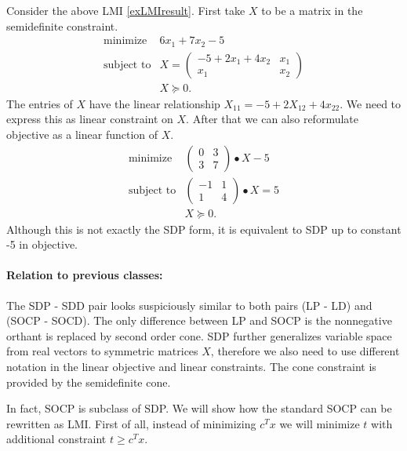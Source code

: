 \documentclass[10pt,oneside]{book}
\theoremstyle{definition}
\begin{document}
 Consider the above LMI \ref{exLMIresult}. First take $X$ to be a matrix in the semidefinite constraint.
\begin{equation}
\begin{array}{ll}
\mbox{minimize} &   6x_1 + 7x_2 -5 \\
\mbox{subject to}& X = \left(\begin{array}{cc}-5 + 2x_1 + 4x_2 & x_1\\ x_1&x_2\end{array}\right)  \\
& X\succeq 0.
\end{array} 
\end{equation}
The entries of $X$ have the linear relationship  $X_{11} = -5 + 2X_{12} + 4x_{22}.$ We need to express this as linear constraint on $X$. After that we can also reformulate objective as a linear function of $X$.
\begin{equation}
\begin{array}{ll}
\mbox{minimize} &  \left(\begin{array}{cc} 0&3\\ 3&7\end{array}\right)\bullet X  -5 \\
\mbox{subject to}& \left(\begin{array}{rr}-1&1\\ 1&4\end{array}\right)\bullet X = 5  \\
& X\succeq 0.
\end{array} 
\end{equation}
Although this is not exactly the SDP form, it is equivalent to SDP up to constant -5 in objective.


\paragraph{Relation to previous classes:}
The  SDP - SDD pair looks suspiciously similar to both pairs (LP - LD) and (SOCP - SOCD). 
The only difference between LP and SOCP is the nonnegative orthant is replaced by second order cone. SDP further generalizes variable space from real vectors to symmetric matrices $X$, therefore we also need to use different notation in the linear objective and linear constraints. The cone constraint is provided by the semidefinite cone.

In fact, SOCP is subclass of SDP. We will show how the standard SOCP can be rewritten as LMI.
First of all, instead of minimizing $c^Tx$ we will minimize $t$ with additional constraint $t\geq c^Tx$. 
\end{document}
